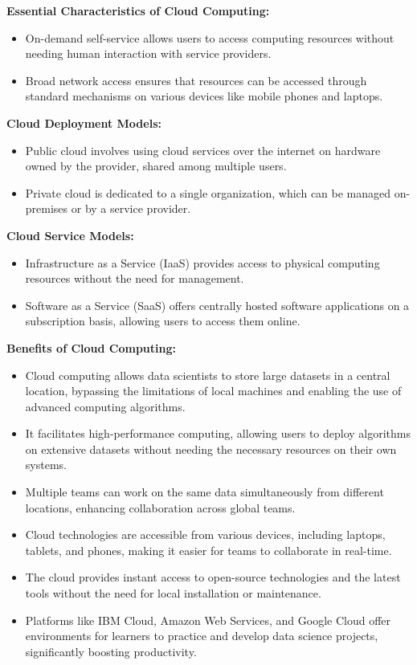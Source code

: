 \documentclass[12pt]{report} %
\begin{document}
	\noindent \textbf{Essential Characteristics of Cloud Computing:}
	\begin{itemize}
		\item On-demand self-service allows users to access computing resources without needing human interaction with service providers.
		\item Broad network access ensures that resources can be accessed through standard mechanisms on various devices like mobile phones and laptops.
	\end{itemize}
	
	\noindent \textbf{Cloud Deployment Models:}
	\begin{itemize}
		\item Public cloud involves using cloud services over the internet on hardware owned by the provider, shared among multiple users.
		\item Private cloud is dedicated to a single organization, which can be managed on-premises or by a service provider.
	\end{itemize}

	\noindent \textbf{Cloud Service Models:}
	\begin{itemize}
		\item Infrastructure as a Service (IaaS) provides access to physical computing resources without the need for management.
		\item Software as a Service (SaaS) offers centrally hosted software applications on a subscription basis, allowing users to access them online.
	\end{itemize}

	\noindent \textbf{Benefits of Cloud Computing:}
	\begin{itemize}
		\item Cloud computing allows data scientists to store large datasets in a central location, bypassing the limitations of local machines and enabling the use of advanced computing algorithms.
		\item It facilitates high-performance computing, allowing users to deploy algorithms on extensive datasets without needing the necessary resources on their own systems.
		\item Multiple teams can work on the same data simultaneously from different locations, enhancing collaboration across global teams.
		\item Cloud technologies are accessible from various devices, including laptops, tablets, and phones, making it easier for teams to collaborate in real-time.
		\item The cloud provides instant access to open-source technologies and the latest tools without the need for local installation or maintenance.
		\item Platforms like IBM Cloud, Amazon Web Services, and Google Cloud offer environments for learners to practice and develop data science projects, significantly boosting productivity. \\
	\end{itemize}
\end{document}
